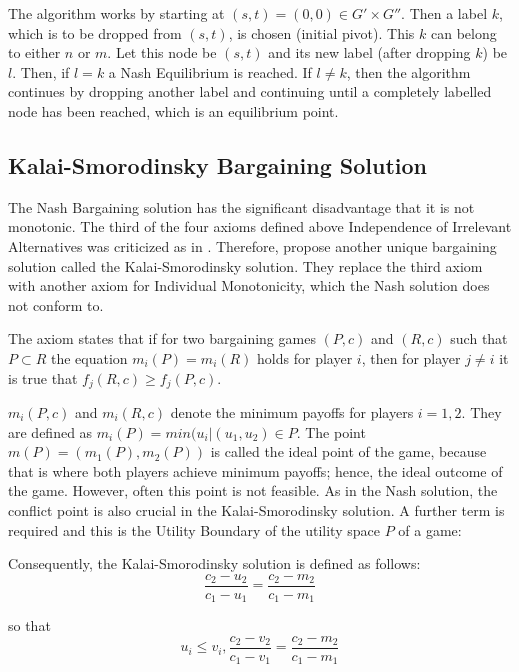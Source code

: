 {The algorithm works by starting at $(s,t) = (0,0) \in G' \times G'' $. Then a label $k$, which is to be dropped from $(s,t)$, is chosen (initial pivot). This $k$ can belong to either $n$ or $m$. Let this node be $(s,t)$ and its new label (after dropping $k$) be $l$. Then, if $l=k$ a Nash Equilibrium is reached. If $l\neq k$, then the algorithm continues by dropping another label and continuing until a completely labelled node has been reached, which is an equilibrium point.

\subsection{Kalai-Smorodinsky Bargaining Solution}
The Nash Bargaining solution has the significant disadvantage that it is not monotonic. The third of the four axioms defined above Independence of Irrelevant Alternatives was criticized as in \citet{kalai1975other}. Therefore, \citet{kalai1975other} propose another unique bargaining solution called the Kalai-Smorodinsky solution. They replace the third axiom with another axiom for Individual Monotonicity, which the Nash solution does not conform to. 

The axiom states that if for two bargaining games $(P,c)$ and $(R,c)$ such that $P \subset R$ the equation $m_i(P) = m_i(R)$ holds for player $i$, then for player $j \neq i$ it is true that $f_j(R,c) \geq f_j(P,c)$.

$m_i(P,c)$ and $m_i(R,c)$ denote the minimum payoffs for players $i = 1,2$. They are defined as $m_i(P) = min(u_i | (u_1,u_2) \in P$. The point $m(P) = (m_1(P),m_2(P))$ is called the ideal point of the game, because that is where both players achieve minimum payoffs; hence, the ideal outcome of the game. However, often this point is not feasible. As in the Nash solution, the conflict point is also crucial in the Kalai-Smorodinsky solution. A further term is required and this is the Utility Boundary of the utility space $P$ of a game:


Consequently, the Kalai-Smorodinsky solution is defined as follows:
\begin{equation}
\label{eq:kalaismorodinsky}
\frac{c_2 - u_2}{c_1 - u_1} = \frac{c_2 - m_2}{c_1 - m_1}
\end{equation}

so that
\begin{equation}
u_i \leq v_i, \frac{c_2 - v_2}{c_1 - v_1} = \frac{c_2 - m_2}{c_1 - m_1} 
\end{equation}

}
